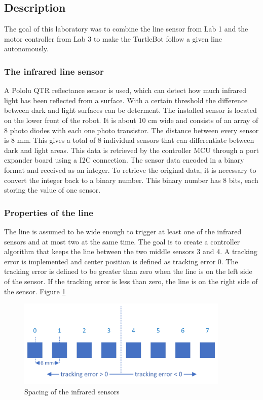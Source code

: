 \documentclass[english]{article}
\begin{document}
\subsection{Description}
The goal of this laboratory was to combine the line sensor from
Lab 1 and the motor controller from Lab 3 to make the TurtleBot 
follow a given line autonomously.  

\subsubsection{The infrared line sensor} 
A Pololu QTR reflectance sensor is used, which can detect how much infrared 
light has been reflected from a surface. With a certain threshold the difference between dark and light surfaces can be determent. The installed sensor is located on the lower front of the
 robot. It is about 10 cm wide and consists of an array of 8 photo diodes with each one 
 photo transistor. The distance between every sensor is 8 mm. This gives a total of 8
  individual sensors that can differentiate between dark and light areas. This data is 
 retrieved by the controller MCU through a port expander board using a I2C connection.
  The sensor data encoded in a binary format and received as an integer. To retrieve
  the original data, it is necessary to convert the integer back to a binary number.
 This binary number has 8 bits, each storing the value of one sensor.  
 
\subsubsection{Properties of the line} 
The line is assumed to be wide enough to trigger at least one of the infrared sensors 
and at most two at the same time. The goal is to create a controller algorithm that 
keeps the line between the two middle sensors 3 and 4. A tracking 
error is implemented and center position is defined as tracking error 0. The tracking error is defined to be greater than zero when the line is on the left side of the sensor. If the tracking 
error is less than zero, the line is on the right side of the sensor. Figure \ref{fig:line}
\begin{figure}[!h]
    \centering
    \includegraphics[width=0.90\textwidth, height=0.25\textheight]{figures/line.png}
    \caption{Spacing of the infrared sensors}
    \label{fig:line}
\end{figure}
\end{document}
